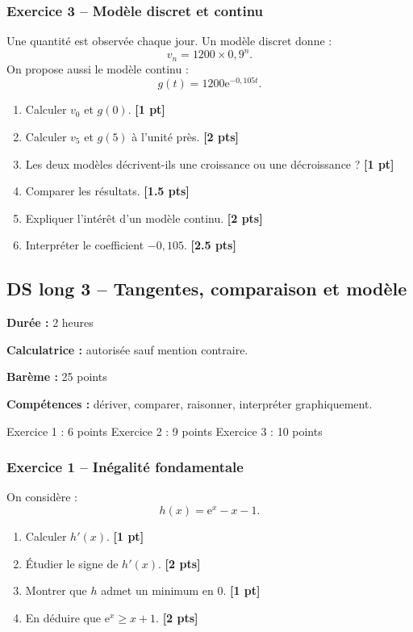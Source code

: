 \documentclass[11pt,a4paper]{article}
\newcommand{\e}{\mathrm{e}}
\newcommand{\pts}[1]{\hfill \textbf{[#1 pt]}}
\newcommand{\ptss}[1]{\hfill \textbf{[#1 pts]}}
\newcommand{\competences}[1]{\textbf{Compétences :} #1}
\newcommand{\calculatrice}{\textbf{Calculatrice :} autorisée sauf mention contraire.}
\newcommand{\duree}[1]{\textbf{Durée :} #1}
\newcommand{\bareme}[1]{\textbf{Barème :} #1}
\begin{document}
\subsubsection*{Exercice 3 -- Modèle discret et continu}

Une quantité est observée chaque jour. Un modèle discret donne :
\[
v_n=1200\times 0,9^n.
\]
On propose aussi le modèle continu :
\[
g(t)=1200\e^{-0,105t}.
\]
\begin{enumerate}
    \item Calculer $v_0$ et $g(0)$. \pts{1}
    \item Calculer $v_5$ et $g(5)$ à l'unité près. \ptss{2}
    \item Les deux modèles décrivent-ils une croissance ou une décroissance ? \pts{1}
    \item Comparer les résultats. \ptss{1.5}
    \item Expliquer l'intérêt d'un modèle continu. \ptss{2}
    \item Interpréter le coefficient $-0,105$. \ptss{2.5}
\end{enumerate}

\newpage

\subsection*{DS long 3 -- Tangentes, comparaison et modèle}

\begin{sujetbox}
\duree{2 heures}

\calculatrice

\bareme{25 points}

\competences{dériver, comparer, raisonner, interpréter graphiquement.}
\end{sujetbox}

\begin{baremebox}
Exercice 1 : 6 points \quad
Exercice 2 : 9 points \quad
Exercice 3 : 10 points
\end{baremebox}

\subsubsection*{Exercice 1 -- Inégalité fondamentale}

On considère :
\[
h(x)=\e^x-x-1.
\]
\begin{enumerate}
    \item Calculer $h'(x)$. \pts{1}
    \item Étudier le signe de $h'(x)$. \ptss{2}
    \item Montrer que $h$ admet un minimum en $0$. \pts{1}
    \item En déduire que $\e^x\geq x+1$. \ptss{2}
\end{enumerate}
\end{document}
